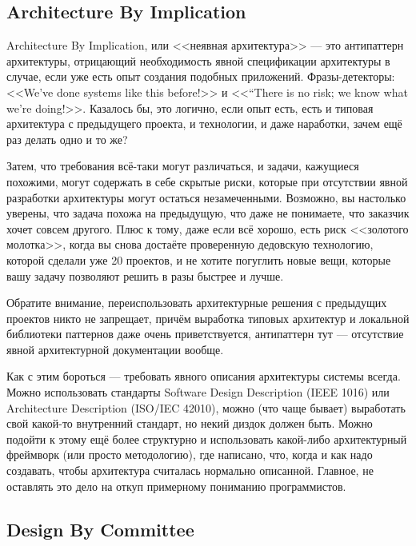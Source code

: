 \documentclass{../../text-style}
\begin{document}
\subsection{Architecture By Implication}

Architecture By Implication, или <<неявная архитектура>> --- это антипаттерн архитектуры, отрицающий необходимость явной спецификации архитектуры в случае, если уже есть опыт создания подобных приложений. Фразы-детекторы: <<We’ve done systems like this before!>> и <<“There is no risk; we know what we’re doing!>>. Казалось бы, это логично, если опыт есть, есть и типовая архитектура с предыдущего проекта, и технологии, и даже наработки, зачем ещё раз делать одно и то же?

Затем, что требования всё-таки могут различаться, и задачи, кажущиеся похожими, могут содержать в себе скрытые риски, которые при отсутствии явной разработки архитектуры могут остаться незамеченными. Возможно, вы настолько уверены, что задача похожа на предыдущую, что даже не понимаете, что заказчик хочет совсем другого. Плюс к тому, даже если всё хорошо, есть риск <<золотого молотка>>, когда вы снова достаёте проверенную дедовскую технологию, которой сделали уже 20 проектов, и не хотите погуглить новые вещи, которые вашу задачу позволяют решить в разы быстрее и лучше. 

Обратите внимание, переиспользовать архитектурные решения с предыдущих проектов никто не запрещает, причём выработка типовых архитектур и локальной библиотеки паттернов даже очень приветствуется, антипаттерн тут --- отсутствие явной архитектурной документации вообще.

Как с этим бороться --- требовать явного описания архитектуры системы всегда. Можно использовать стандарты Software Design Description (IEEE 1016) или Architecture Description (ISO/IEC 42010), можно (что чаще бывает) выработать свой какой-то внутренний стандарт, но некий диздок должен быть. Можно подойти к этому ещё более структурно и использовать какой-либо архитектурный фреймворк (или просто методологию), где написано, что, когда и как надо создавать, чтобы архитектура считалась нормально описанной. Главное, не оставлять это дело на откуп примерному пониманию программистов.

\subsection{Design By Committee}
\end{document}
